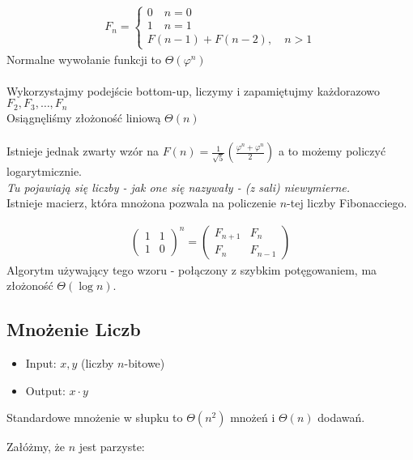 \documentclass{article}
\numberwithin{equation}{subsection}
\begin{document}
\begin{align}
    F_n = \begin{cases}
        0 \quad n = 0\\
        1 \quad n = 1\\
        F(n-1) + F(n-2) ,\quad n > 1
    \end{cases}
\end{align}
Normalne wywołanie funkcji to $\Theta(\varphi^n)$\\\\
Wykorzystajmy podejście bottom-up, liczymy i zapamiętujmy każdorazowo $F_2, F_3,\dots, F_n$\\
Osiągnęliśmy złożoność liniową $\Theta(n)$\\\\
Istnieje jednak zwarty wzór na $F(n)=\frac{1}{\sqrt{5}}\left(\frac{\varphi^n + \varphi^n}{2}\right)$
a to możemy policzyć logarytmicznie.\\

\textit{Tu pojawiają się liczby - jak one się nazywały - (z sali) niewymierne.}\\

\noindent
Istnieje macierz, która mnożona pozwala na policzenie $n$-tej liczby Fibonacciego.

\begin{align}
    \begin{pmatrix}
        1 & 1 \\
        1 & 0
    \end{pmatrix}^n =
    \begin{pmatrix}
        F_{n+1} & F_{n} \\
        F_{n} & F_{n-1}
    \end{pmatrix}
\end{align}
Algorytm używający tego wzoru - połączony z szybkim potęgowaniem, ma złożoność $\Theta(\log n)$.

\subsection{Mnożenie Liczb}

\begin{itemize}
    \item Input: $x,y$ (liczby $n$-bitowe)
    \item Output: $x\cdot y$
\end{itemize}
Standardowe mnożenie w słupku to $\Theta(n^2)$ mnożeń i $\Theta(n)$ dodawań.

\noindent
Załóżmy, że $n$ jest parzyste:
\end{document}
